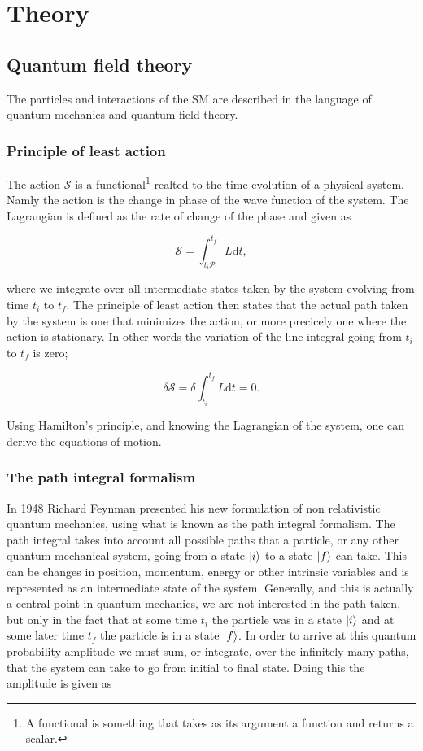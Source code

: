 \section{Theory}
\subsection{Quantum field theory}
The particles and interactions of the SM are described in the language of quantum mechanics and quantum field theory.

\subsubsection{Principle of least action}
The action $\mathcal{S}$ is a functional\footnote{A functional is something that takes as its argument a function and returns a scalar.} realted to the time evolution of a physical system. Namly the action is the change in phase of the wave function of the system. The Lagrangian is defined as the rate of change of the phase and given as

\begin{equation}
	\mathcal{S} = \int_{t_i \mathcal{P}}^{t_f} L \textrm{d}t,
\end{equation}

where we integrate over all intermediate states taken by the system evolving from time $t_i$ to $t_f$. The principle of least action then states that the actual path taken by the system is one that minimizes the action, or more precicely one where the action is stationary. In other words the variation of the line integral going from $t_i$ to $t_f$ is zero\cite{goldstein1959};

\begin{equation}
	\delta \mathcal{S} = \delta \int_{t_i}^{t_f} L \textrm{d}t = 0.
\end{equation}

Using Hamilton's principle, and knowing the Lagrangian of the system, one can derive the equations of motion.

\subsubsection{The path integral formalism}
In 1948 Richard Feynman presented his new formulation of non relativistic quantum mechanics, using what is known as the path integral formalism\cite{feynman1948sta}. The path integral takes into account all possible paths that a particle, or any other quantum mechanical system, going from a state $|i \rangle$ to a state $|f \rangle$ can take. This can be changes in position, momentum, energy or other intrinsic variables and is represented as an intermediate state of the system. Generally, and this is actually a central point in quantum mechanics, we are not interested in the path taken, but only in the fact that at some time $t_{i}$ the particle was in a state $|i \rangle$ and at some later time $t_{f}$ the particle is in a state $|f \rangle$. In order to arrive at this quantum probability-amplitude we must sum, or integrate, over the infinitely many paths, that the system can take to go from initial to final state. Doing this the amplitude is given as \cite{richter_path_integrals}


